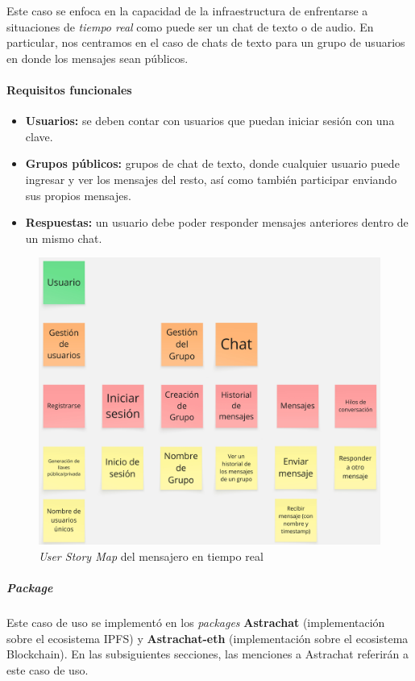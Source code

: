 Este caso se enfoca en la capacidad de la infraestructura de enfrentarse a situaciones de \textit{tiempo real} como puede ser un chat de texto o de audio. En particular, nos centramos en el caso de chats de texto para un grupo de usuarios en donde los mensajes sean públicos.

\paragraph{Requisitos funcionales}

\begin{itemize}
    \item \textbf{Usuarios:} se deben contar con usuarios que puedan iniciar sesión con una clave.
    \item \textbf{Grupos públicos:} grupos de chat de texto, donde cualquier usuario puede ingresar y ver los mensajes del resto, así como también participar enviando sus propios mensajes.
    \item \textbf{Respuestas:} un usuario debe poder responder mensajes anteriores dentro de un mismo chat.
\end{itemize}

\begin{figure}[H]
    \centering
    \includegraphics[width=0.5\linewidth]{img/usm-mensajero.jpg}
    \caption{\textit{User Story Map} del mensajero en tiempo real}
    \label{fig:enter-label}
\end{figure}

\subparagraph{Package}

Este caso de uso se implementó en los \textit{packages} \textbf{Astrachat} \cite{astrachat-ipfs} (implementación sobre el ecosistema IPFS) y \textbf{Astrachat-eth} \cite{astrachat-eth} (implementación sobre el ecosistema Blockchain). En las subsiguientes secciones, las menciones a Astrachat referirán a este caso de uso.





